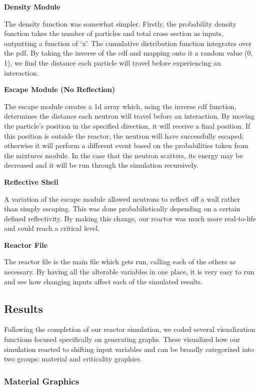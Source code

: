 \documentclass{notes}
\begin{document}
\textbf{Density Module}

The density function was somewhat simpler. Firstly, the probability density function takes the number of particles and total cross section as inputs, outputting a function of `x'. The cumulative distribution function integrates over the pdf. By taking the inverse of the cdf and mapping onto it a random value (0, 1), we find the distance each particle will travel before experiencing an interaction. \cite{OpenMC}

\textbf{Escape Module (No Reflection)}

The escape module creates a 1d array which, using the inverse cdf function, determines the distance each neutron will travel before an interaction. By moving the particle's position in the specified direction, it will receive a final position. If this position is outside the reactor, the neutron will have successfully escaped; otherwise it will perform a different event based on the probabilities taken from the mixtures module. In the case that the neutron scatters, its energy may be decreased and it will be run through the simulation recursively.

\textbf{Reflective Shell}

A variation of the escape module allowed neutrons to reflect off a wall rather than simply escaping. This was done probabilistically depending on a certain defined reflectivity. By making this change, our reactor was much more real-to-life and could reach a critical level.

\textbf{Reactor File}

The reactor file is the main file which gets run, calling each of the others as necessary. By having all the alterable variables in one place, it is very easy to run and see how changing inputs affect each of the simulated results.

\subsection*{Results}

Following the completion of our reactor simulation, we coded several visualization functions focused specifically on generating graphs. These visualized how our simulation reacted to shifting input variables and can be broadly categorized into two groups: material and criticality graphics.

\subsubsection*{Material Graphics}
\end{document}
